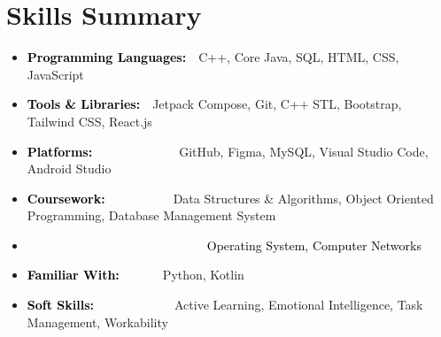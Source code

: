 \documentclass[a4paper,20pt]{article}
\begin{document}

\section{Skills Summary}
\vspace{5pt}
\begin{itemize}[label=\textbullet, labelsep=0.5em, left=0.5em, itemsep=-0.2em]
  \item \textcolor{black}{\textbf{Programming Languages:}}{~~C++, Core Java, SQL, HTML, CSS, JavaScript}
  \item \textcolor{black}{\textbf{Tools \& Libraries:}}{~~Jetpack Compose, Git, C++ STL, Bootstrap, Tailwind CSS, React.js}
  \item \textcolor{black}{\textbf{Platforms:}}{~~~~~~~~~~~~~~GitHub, Figma, MySQL, Visual Studio Code, Android Studio}
  \item \textcolor{black}{\textbf{Coursework:}}{~~~~~~~~~~~Data Structures \& Algorithms, Object Oriented Programming, Database Management System}
  \item[] \textcolor{black}{~~~~~~~~~~~~~~~~~~~~~~~~~~~~~Operating System, Computer Networks}
  \item \textcolor{black}{\textbf{Familiar With:}}{~~~~~~~Python, Kotlin}
  \item \textcolor{black}{\textbf{Soft Skills:}}{~~~~~~~~~~~~~Active Learning, Emotional Intelligence, Task Management, Workability}
\end{itemize}
\vspace{2pt}


\end{document}
